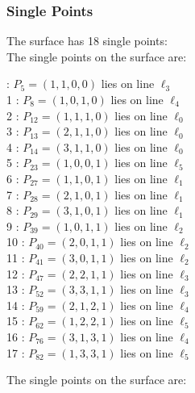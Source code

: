 \documentclass{article}
\begin{document}
{\subsubsection*{Single Points}
The surface has 18 single points:\\
The single points on the surface are:\\
\begin{multicols}{2}
 : $P_{5}=( 1, 1, 0, 0 )$ lies on line $\ell_{3}$\\
1 : $P_{8}=( 1, 0, 1, 0 )$ lies on line $\ell_{4}$\\
2 : $P_{12}=( 1, 1, 1, 0 )$ lies on line $\ell_{0}$\\
3 : $P_{13}=( 2, 1, 1, 0 )$ lies on line $\ell_{0}$\\
4 : $P_{14}=( 3, 1, 1, 0 )$ lies on line $\ell_{0}$\\
5 : $P_{23}=( 1, 0, 0, 1 )$ lies on line $\ell_{5}$\\
6 : $P_{27}=( 1, 1, 0, 1 )$ lies on line $\ell_{1}$\\
7 : $P_{28}=( 2, 1, 0, 1 )$ lies on line $\ell_{1}$\\
8 : $P_{29}=( 3, 1, 0, 1 )$ lies on line $\ell_{1}$\\
9 : $P_{39}=( 1, 0, 1, 1 )$ lies on line $\ell_{2}$\\
10 : $P_{40}=( 2, 0, 1, 1 )$ lies on line $\ell_{2}$\\
11 : $P_{41}=( 3, 0, 1, 1 )$ lies on line $\ell_{2}$\\
12 : $P_{47}=( 2, 2, 1, 1 )$ lies on line $\ell_{3}$\\
13 : $P_{52}=( 3, 3, 1, 1 )$ lies on line $\ell_{3}$\\
14 : $P_{59}=( 2, 1, 2, 1 )$ lies on line $\ell_{4}$\\
15 : $P_{62}=( 1, 2, 2, 1 )$ lies on line $\ell_{5}$\\
16 : $P_{76}=( 3, 1, 3, 1 )$ lies on line $\ell_{4}$\\
17 : $P_{82}=( 1, 3, 3, 1 )$ lies on line $\ell_{5}$\\
\end{multicols}
The single points on the surface are:\\
}
\end{document}
